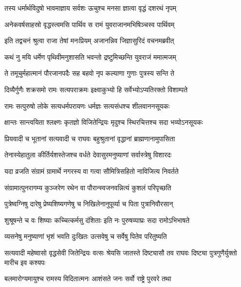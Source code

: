 \twolineshloka
{तस्य धर्मार्थविदुषो भावमाज्ञाय सर्वशः}
{ऊचुश्च मनसा ज्ञात्वा वृद्धं दशरथं नृपम्} %

\twolineshloka
{अनेकवर्षसाहस्रो वृद्धस्त्वमसि पार्थिव}
{स रामं युवराजानमभिषिञ्चस्व पार्थिवम्} %

\twolineshloka
{इति तद्वचनं श्रुत्वा राजा तेषां मनःप्रियम्}
{अजानन्निव जिज्ञासुरिदं वचनमब्रवीत्} %

\twolineshloka
{कथं नु मयि धर्मेण पृथिवीमनुशासति}
{भवन्तो द्रष्टुमिच्छन्ति युवराजं ममात्मजम्} %

\twolineshloka
{ते तमूचुर्महात्मानं पौरजानपदैः सह}
{बहवो नृप कल्याणा गुणाः पुत्रस्य सन्ति ते} %

\twolineshloka
{दिव्यैर्गुणैः शक्रसमो रामः सत्यपराक्रमः}
{इक्ष्वाकुभ्यो हि सर्वेभ्योऽप्यतिरक्तो विशाम्पते} %

\twolineshloka
{रामः सत्पुरुषो लोके सत्यधर्मपरायणः}
{धर्मज्ञः सत्यसंधश्च शीलवाननसूयकः} %

\twolineshloka
{क्षान्तः सान्त्वयिता श्लक्ष्णः कृतज्ञो विजितेन्द्रियः}
{मृदुश्च स्थिरचित्तश्च सदा भव्योऽनसूयकः} %

\twolineshloka
{प्रियवादी च भूतानां सत्यवादी च राघवः}
{बहुश्रुतानां वृद्धानां ब्राह्मणानामुपासिता} %

\twolineshloka
{तेनास्येहातुला कीर्तिर्यशस्तेजश्च वर्धते}
{देवासुरमनुष्याणां सर्वास्त्रेषु विशारदः} %

\twolineshloka
{यदा व्रजति संग्रामं ग्रामार्थे नगरस्य वा}
{गत्वा सौमित्रिसहितो नाविजित्य निवर्तते} %

\twolineshloka
{संग्रामात्पुनरागम्य कुञ्जरेण रथेन वा}
{पौरान्स्वजनवन्नित्यं कुशलं परिपृच्छति} %

\twolineshloka
{पुत्रेष्वग्निषु दारेषु प्रेष्यशिष्यगणेषु च}
{निखिलेनानुपूर्व्या च पिता पुत्रानिवौरसान्} %

\twolineshloka
{शुश्रूषन्ते च वः शिष्याः कच्चित्कर्मसु दंशिताः}
{इति नः पुरुषव्याघ्रः सदा रामोऽभिभाषते} %

\twolineshloka
{व्यसनेषु मनुष्याणां भृशं भवति दुःखितः}
{उत्सवेषु च सर्वेषु पितेव परितुष्यति} %

\threelineshloka
{सत्यवादी महेष्वासो वृद्धसेवी जितेन्द्रियः}
{वत्सः श्रेयसि जातस्ते दिष्ट्यासौ तव राघवः}
{दिष्ट्या पुत्रगुणैर्युक्तो मारीच इव कश्यपः} %

\twolineshloka
{बलमारोग्यमायुश्च रामस्य विदितात्मनः}
{आशंसते जनः सर्वो राष्ट्रे पुरवरे तथा} %

